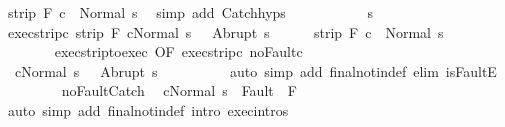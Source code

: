 \begin{isabellebody}
\ {\isachardoublequoteopen}strip\ F\ {\isasymGamma}{\isasymturnstile}c{}\ {\isasymdown}\ Normal\ s{\isachardoublequoteclose}\ \isamarkupfalse%
\ {\isacharparenleft}simp\ add{\isacharcolon}\ Catch{\isachardot}hyps{\isacharparenright}\isanewline
\ \ \isamarkupfalse%
\isanewline
\ \ \isacommand{{\isacharbraceleft}}\isamarkupfalse%
\isanewline
\ \ \ \ \isamarkupfalse%
\ s{\isacharprime}\isanewline
\ \ \ \ \isamarkupfalse%
\ exec{\isacharunderscore}strip{\isacharunderscore}c{}{\isacharcolon}\ {\isachardoublequoteopen}strip\ F\ {\isasymGamma}{\isasymturnstile}{\isasymlangle}c{}{\isacharcomma}Normal\ s\ {\isasymrangle}\ {\isasymRightarrow}\ Abrupt\ s{\isacharprime}{\isachardoublequoteclose}\isanewline
\ \ \ \ \isamarkupfalse%
\ {\isachardoublequoteopen}strip\ F\ {\isasymGamma}{\isasymturnstile}c{}\ {\isasymdown}\ Normal\ s{\isacharprime}{\isachardoublequoteclose}\isanewline
\ \ \ \ \isamarkupfalse%
\ {\isacharminus}\isanewline
\ \ \ \ \ \ \isamarkupfalse%
\ exec{\isacharunderscore}strip{\isacharunderscore}to{\isacharunderscore}exec\ {\isacharbrackleft}OF\ exec{\isacharunderscore}strip{\isacharunderscore}c{}{\isacharbrackright}\ noFault{\isacharunderscore}c{}\isanewline
\ \ \ \ \ \ \isamarkupfalse%
\ {\isacharasterisk}{\isacharcolon}\ {\isachardoublequoteopen}{\isasymGamma}{\isasymturnstile}{\isasymlangle}c{}{\isacharcomma}Normal\ s\ {\isasymrangle}\ {\isasymRightarrow}\ Abrupt\ s{\isacharprime}{\isachardoublequoteclose}\isanewline
\ \ \ \ \ \ \ \ \isamarkupfalse%
\ {\isacharparenleft}auto\ simp\ add{\isacharcolon}\ final{\isacharunderscore}notin{\isacharunderscore}def\ elim{\isacharbang}{\isacharcolon}\ isFaultE{\isacharparenright}\isanewline
\ \ \ \ \ \ \isamarkupfalse%
\ {\isacharasterisk}\ noFault{\isacharunderscore}Catch\ \isamarkupfalse%
\ {\isachardoublequoteopen}{\isasymGamma}{\isasymturnstile}{\isasymlangle}c{}{\isacharcomma}Normal\ s{\isacharprime}\ {\isasymrangle}\ {\isasymRightarrow}{\isasymnotin}Fault\ {\isacharbackquote}\ F{\isachardoublequoteclose}\isanewline
\ \ \ \ \ \ \ \ \isamarkupfalse%
\ {\isacharparenleft}auto\ simp\ add{\isacharcolon}\ final{\isacharunderscore}notin{\isacharunderscore}def\ intro{\isacharcolon}\ exec{\isachardot}intros{\isacharparenright}\isanewline
\ \ \ \ \ \ \isamarkupfalse%
\ {\isacharasterisk}\ \isamarkupfalse%

\end{isabellebody}
